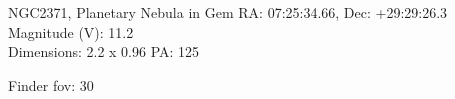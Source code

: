 \begin{block}{NGC2371, Planetary Nebula in Gem}
    RA: 07:25:34.66, Dec: +29:29:26.3 \\ 
    Magnitude (V): 11.2 \\ 
    Dimensions: 2.2 x 0.96 PA: 125 

    Finder fov: 30 
\end{block}